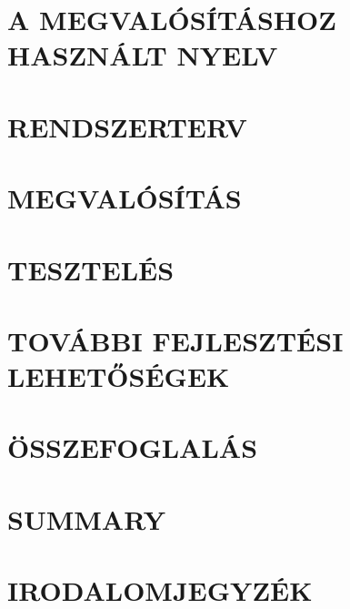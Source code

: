 \documentclass[12pt,a4paper]{article}
\begin{document}
\clearpage
\section{A MEGVALÓSÍTÁSHOZ HASZNÁLT NYELV}
\label{sec:language}


\clearpage
\section{RENDSZERTERV}
\label{sec:plan}


\clearpage
\section{MEGVALÓSÍTÁS}
\label{sec:execution}


\clearpage
\section{TESZTELÉS}
\label{sec:testing}


\clearpage
\section{TOVÁBBI FEJLESZTÉSI LEHETŐSÉGEK}


\clearpage
\section{ÖSSZEFOGLALÁS}


\clearpage
\section{SUMMARY}




\clearpage
\section{IRODALOMJEGYZÉK}
\printbibliography[heading=none]

\clearpage
\renewcommand{\listfigurename}{ÁBRAJEGYZÉK}
\listoffigures

\clearpage
\renewcommand{\listtablename}{TÁBLAJEGYZÉK}
\listoftables

\clearpage
\renewcommand{\lstlistlistingname}{FORRÁSKÓDJEGYZÉK}
\lstlistoflistings


\end{document}
